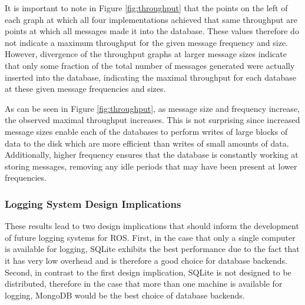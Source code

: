 \documentclass[nocopyrightspace]{acm_proc_article-sp}
\begin{document}
It is important to note in Figure \ref{fig:throughput} that the points on the left of each graph at which all four implementations achieved that same throughput are points at which all messages made it into the database. These values therefore do not indicate a maximum throughput for the given message frequency and size. However, divergence of the throughput graphs at larger message sizes indicate that only some fraction of the total number of messages generated were actually inserted into the database, indicating the maximal throughput for each database at these given message frequencies and sizes. 

As can be seen in Figure \ref{fig:throughput}, as message size and frequency increase, the observed maximal throughput increases. This is not surprising since increased message sizes enable each of the databases to perform writes of large blocks of data to the disk which are more efficient than writes of small amounts of data. Additionally, higher frequency ensures that the database is constantly working at storing messages, removing any idle periods that may have been present at lower frequencies.

\subsubsection{Logging System Design Implications}

These results lead to two design implications that should inform the development of future logging systems for ROS. First, in the case that only a single computer is available for logging, SQLite exhibits the best performance due to the fact that it has very low overhead and is therefore a good choice for database backends. Second, in contrast to the first design implication, SQLite is not designed to be distributed, therefore in the case that more than one machine is available for logging, MongoDB would be the best choice of database backends.
\end{document}
